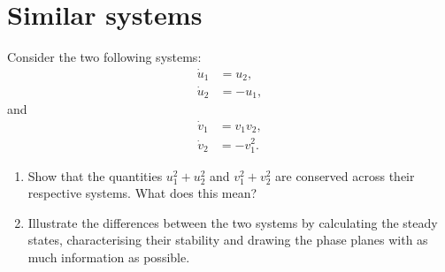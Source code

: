 \documentclass[]{article}
\begin{document}
\section{Similar systems}
Consider the two following systems:
\begin{align}
\dot{u}_1&=u_2,\\
\dot{u}_2&=-u_1,
\end{align}
and
\begin{align}
\dot{v}_1&=v_1v_2,\\
\dot{v}_2&=-v_1^2.\label{v2}
\end{align}
\begin{enumerate}
\item Show that the quantities $u_1^2+u_2^2$ and $v_1^2+v_2^2$ are conserved across their respective systems. What does this mean?
\item Illustrate the differences between the two systems by calculating the steady states, characterising their stability and drawing the phase planes with as much information as possible.
\end{enumerate}
\end{document}
